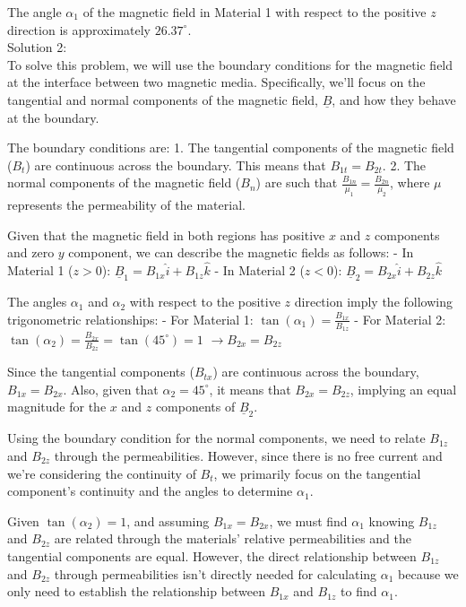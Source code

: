 \documentclass[a4paper,11pt]{article}
\begin{document}
The angle \( \alpha_{1} \) of the magnetic field in Material 1 with respect to the positive \( z \) direction is approximately \( 26.37^\circ \). \\ 

\noindent Solution 2: \\ 

To solve this problem, we will use the boundary conditions for the magnetic field at the interface between two magnetic media. Specifically, we'll focus on the tangential and normal components of the magnetic field, \( \underline{B} \), and how they behave at the boundary.

The boundary conditions are:
1. The tangential components of the magnetic field (\(B_{t}\)) are continuous across the boundary. This means that \(B_{1t} = B_{2t}\).
2. The normal components of the magnetic field (\(B_{n}\)) are such that \(\frac{B_{1n}}{\mu_{1}} = \frac{B_{2n}}{\mu_{2}}\), where \( \mu \) represents the permeability of the material.

Given that the magnetic field in both regions has positive \(x\) and \(z\) components and zero \(y\) component, we can describe the magnetic fields as follows:
- In Material 1 (\(z > 0\)): \( \underline{B}_{1} = B_{1x} \hat{i} + B_{1z} \hat{k} \)
- In Material 2 (\(z < 0\)): \( \underline{B}_{2} = B_{2x} \hat{i} + B_{2z} \hat{k} \)

The angles \( \alpha_{1} \) and \( \alpha_{2} \) with respect to the positive \(z\) direction imply the following trigonometric relationships:
- For Material 1: \( \tan(\alpha_{1}) = \frac{B_{1x}}{B_{1z}} \)
- For Material 2: \( \tan(\alpha_{2}) = \frac{B_{2x}}{B_{2z}} = \tan(45^\circ) = 1 \) \( \rightarrow B_{2x} = B_{2z} \)

Since the tangential components (\(B_{tx}\)) are continuous across the boundary, \( B_{1x} = B_{2x} \). Also, given that \( \alpha_{2} = 45^\circ \), it means that \( B_{2x} = B_{2z} \), implying an equal magnitude for the \(x\) and \(z\) components of \( \underline{B}_{2} \).

Using the boundary condition for the normal components, we need to relate \(B_{1z}\) and \(B_{2z}\) through the permeabilities. However, since there is no free current and we're considering the continuity of \(B_{t}\), we primarily focus on the tangential component's continuity and the angles to determine \( \alpha_{1} \).

Given \( \tan(\alpha_{2}) = 1 \), and assuming \(B_{1x} = B_{2x}\), we must find \( \alpha_{1} \) knowing \(B_{1z}\) and \(B_{2z}\) are related through the materials' relative permeabilities and the tangential components are equal. However, the direct relationship between \(B_{1z}\) and \(B_{2z}\) through permeabilities isn't directly needed for calculating \( \alpha_{1} \) because we only need to establish the relationship between \(B_{1x}\) and \(B_{1z}\) to find \( \alpha_{1} \).
\end{document}
